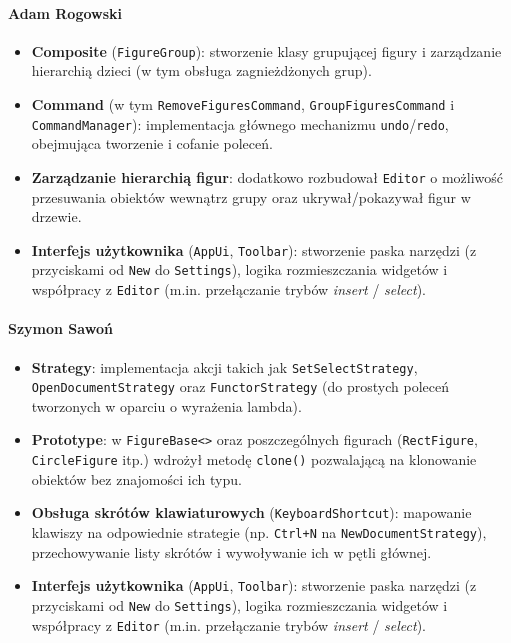 \documentclass[a4paper,12pt]{article}
\begin{document}
\paragraph{Adam Rogowski}
\begin{itemize}
    \item \textbf{Composite} (\texttt{FigureGroup}): stworzenie klasy grupującej figury i zarządzanie hierarchią dzieci (w tym obsługa zagnieżdżonych grup).
    \item \textbf{Command} (w tym \texttt{RemoveFiguresCommand}, \texttt{GroupFiguresCommand} i \texttt{CommandManager}): implementacja głównego mechanizmu \texttt{undo}/\texttt{redo}, obejmująca tworzenie i cofanie poleceń.
    \item \textbf{Zarządzanie hierarchią figur}: dodatkowo rozbudował \texttt{Editor} o możliwość przesuwania obiektów wewnątrz grupy oraz ukrywał/pokazywał figur w drzewie.
    \item \textbf{Interfejs użytkownika} (\texttt{AppUi}, \texttt{Toolbar}): stworzenie paska narzędzi (z przyciskami od \texttt{New} do \texttt{Settings}), logika rozmieszczania widgetów i współpracy z \texttt{Editor} (m.in. przełączanie trybów \emph{insert} / \emph{select}).
\end{itemize}

\paragraph{Szymon Sawoń}
\begin{itemize}
    \item \textbf{Strategy}: implementacja akcji takich jak \texttt{SetSelectStrategy}, \texttt{OpenDocumentStrategy} oraz \texttt{FunctorStrategy} (do prostych poleceń tworzonych w oparciu o wyrażenia lambda).
    \item \textbf{Prototype}: w \texttt{FigureBase<>} oraz poszczególnych figurach (\texttt{RectFigure}, \texttt{CircleFigure} itp.) wdrożył metodę \texttt{clone()} pozwalającą na klonowanie obiektów bez znajomości ich typu.
    \item \textbf{Obsługa skrótów klawiaturowych} (\texttt{KeyboardShortcut}): mapowanie klawiszy na odpowiednie strategie (np. \texttt{Ctrl+N} na \texttt{NewDocumentStrategy}), przechowywanie listy skrótów i wywoływanie ich w pętli głównej.
    \item \textbf{Interfejs użytkownika} (\texttt{AppUi}, \texttt{Toolbar}): stworzenie paska narzędzi (z przyciskami od \texttt{New} do \texttt{Settings}), logika rozmieszczania widgetów i współpracy z \texttt{Editor} (m.in. przełączanie trybów \emph{insert} / \emph{select}).
\end{itemize}
\end{document}
